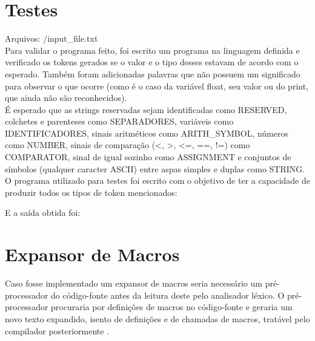\section{Testes}
\label{sec:testes}
Arquivos: /input\_file.txt\\
Para validar o programa feito, foi escrito um programa na linguagem definida e verificado os tokens gerados se o valor e o tipo desses estavam de acordo com o esperado. Também foram adicionadas palavras que não possuem um significado para observar o que ocorre (como é o caso da variável float, seu valor ou do print, que ainda não são reconhecidos).\\
É esperado que as strings reservadas sejam identificadas como RESERVED, colchetes e parenteses como SEPARADORES, variáveis como IDENTIFICADORES, sinais aritméticos como ARITH\_SYMBOL, números como NUMBER, sinais de comparação (<, >, <=, ==, !=) como COMPARATOR, sinal de igual sozinho como ASSIGNMENT e conjuntos de símbolos (qualquer caracter ASCII) entre aspas simples e duplas como STRING.\\
O programa utilizado para testes foi escrito com o objetivo de ter a capacidade de produzir todos os tipos de token mencionados:



E a saída obtida foi:



\section{Expansor de Macros}

Caso fosse implementado um expansor de macros seria necessário um pré-processador do código-fonte antes da leitura deste pelo analisador léxico. O pré-processador procuraria por definições de macros no código-fonte e geraria um novo texto expandido, isento de definições e de chamadas de macros, tratável pelo compilador posteriormente \cite{compilators_introduction}.